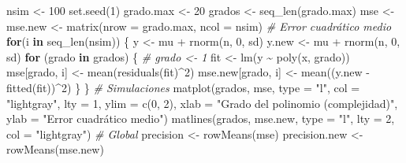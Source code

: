 \documentclass[
  spanish,
]{book}
\newenvironment{Shaded}{\begin{snugshade}}{\end{snugshade}}
\newcommand{\AttributeTok}[1]{\textcolor[rgb]{0.77,0.63,0.00}{#1}}
\newcommand{\CommentTok}[1]{\textcolor[rgb]{0.56,0.35,0.01}{\textit{#1}}}
\newcommand{\ControlFlowTok}[1]{\textcolor[rgb]{0.13,0.29,0.53}{\textbf{#1}}}
\newcommand{\DecValTok}[1]{\textcolor[rgb]{0.00,0.00,0.81}{#1}}
\newcommand{\FunctionTok}[1]{\textcolor[rgb]{0.00,0.00,0.00}{#1}}
\newcommand{\NormalTok}[1]{#1}
\newcommand{\OtherTok}[1]{\textcolor[rgb]{0.56,0.35,0.01}{#1}}
\newcommand{\SpecialCharTok}[1]{\textcolor[rgb]{0.00,0.00,0.00}{#1}}
\newcommand{\StringTok}[1]{\textcolor[rgb]{0.31,0.60,0.02}{#1}}
\theoremstyle{break}
\theoremstyle{definition}
\theoremstyle{definition}
\theoremstyle{definition}
\theoremstyle{definition}
\theoremstyle{remark}
\begin{document}
\begin{Shaded}
\begin{Highlighting}[]
\NormalTok{nsim }\OtherTok{\textless{}{-}} \DecValTok{100}
\FunctionTok{set.seed}\NormalTok{(}\DecValTok{1}\NormalTok{)}
\NormalTok{grado.max }\OtherTok{\textless{}{-}} \DecValTok{20}
\NormalTok{grados }\OtherTok{\textless{}{-}} \FunctionTok{seq\_len}\NormalTok{(grado.max) }
\NormalTok{mse }\OtherTok{\textless{}{-}}\NormalTok{ mse.new }\OtherTok{\textless{}{-}} \FunctionTok{matrix}\NormalTok{(}\AttributeTok{nrow =}\NormalTok{ grado.max, }\AttributeTok{ncol =}\NormalTok{ nsim) }\CommentTok{\# Error cuadrático medio}
\ControlFlowTok{for}\NormalTok{(i }\ControlFlowTok{in} \FunctionTok{seq\_len}\NormalTok{(nsim)) \{}
\NormalTok{  y }\OtherTok{\textless{}{-}}\NormalTok{ mu }\SpecialCharTok{+} \FunctionTok{rnorm}\NormalTok{(n, }\DecValTok{0}\NormalTok{, sd)}
\NormalTok{  y.new }\OtherTok{\textless{}{-}}\NormalTok{ mu }\SpecialCharTok{+} \FunctionTok{rnorm}\NormalTok{(n, }\DecValTok{0}\NormalTok{, sd)}
  \ControlFlowTok{for}\NormalTok{ (grado }\ControlFlowTok{in}\NormalTok{ grados) \{ }\CommentTok{\# grado \textless{}{-} 1}
\NormalTok{    fit }\OtherTok{\textless{}{-}} \FunctionTok{lm}\NormalTok{(y }\SpecialCharTok{\textasciitilde{}} \FunctionTok{poly}\NormalTok{(x, grado))}
\NormalTok{    mse[grado, i] }\OtherTok{\textless{}{-}} \FunctionTok{mean}\NormalTok{(}\FunctionTok{residuals}\NormalTok{(fit)}\SpecialCharTok{\^{}}\DecValTok{2}\NormalTok{)}
\NormalTok{    mse.new[grado, i] }\OtherTok{\textless{}{-}} \FunctionTok{mean}\NormalTok{((y.new }\SpecialCharTok{{-}} \FunctionTok{fitted}\NormalTok{(fit))}\SpecialCharTok{\^{}}\DecValTok{2}\NormalTok{)}
\NormalTok{  \}}
\NormalTok{\}}
\CommentTok{\# Simulaciones}
\FunctionTok{matplot}\NormalTok{(grados, mse, }\AttributeTok{type =} \StringTok{"l"}\NormalTok{, }\AttributeTok{col =} \StringTok{"lightgray"}\NormalTok{, }\AttributeTok{lty =} \DecValTok{1}\NormalTok{, }\AttributeTok{ylim =} \FunctionTok{c}\NormalTok{(}\DecValTok{0}\NormalTok{, }\DecValTok{2}\NormalTok{),}
        \AttributeTok{xlab =} \StringTok{"Grado del polinomio (complejidad)"}\NormalTok{,}
        \AttributeTok{ylab =} \StringTok{"Error cuadrático medio"}\NormalTok{)}
\FunctionTok{matlines}\NormalTok{(grados, mse.new, }\AttributeTok{type =} \StringTok{"l"}\NormalTok{, }\AttributeTok{lty =} \DecValTok{2}\NormalTok{, }\AttributeTok{col =} \StringTok{"lightgray"}\NormalTok{) }
\CommentTok{\# Global}
\NormalTok{precision }\OtherTok{\textless{}{-}} \FunctionTok{rowMeans}\NormalTok{(mse)}
\NormalTok{precision.new }\OtherTok{\textless{}{-}} \FunctionTok{rowMeans}\NormalTok{(mse.new)}

\end{Highlighting}
\end{Shaded}
\end{document}

